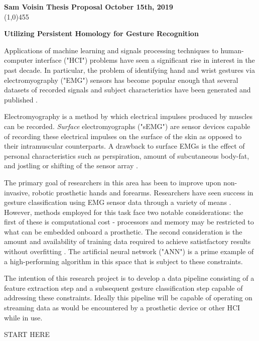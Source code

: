\documentclass[11pt]{article}
\begin{document}
\noindent \textbf{Sam Voisin \hfill  \textbf{Thesis Proposal}  \hfill  October 15th, 2019} \\
\line(1,0){455}

\begin{center}
\Large{{\bf Utilizing Persistent Homology for Gesture Recognition}}\\
\end{center}

Applications of machine learning and signals processing techniques to human-computer interface ("HCI") problems have seen a significant rise in interest in the past decade. In particular, the problem of identifying hand and wrist gestures via electromyography ("EMG") sensors has become popular enough that several datasets of recorded signals and subject characteristics have been generated and published \cite{ninapro} \cite{lobov}.

Electromyography is a method by which electrical impulses produced by muscles can be recorded. \emph{Surface} electromyographs ("sEMG") are sensor devices capable of recording these electrical impulses on the surface of the skin as opposed to their intramuscular counterparts. A drawback to surface EMGs is the effect of personal characteristics such as perspiration, amount of subcutaneous body-fat, and jostling or shifting of the sensor array \cite{lobov}.

The primary goal of researchers in this area has been to improve upon non-invasive, robotic prosthetic hands and forearms. Researchers have seen success in gesture classification using EMG sensor data through a variety of means \cite{state}. However, methods employed for this task face two notable considerations: the first of these is computational cost - processors and memory may be restricted to what can be embedded onboard a prosthetic. The second consideration is the amount and availability of training data required to achieve satistfactory results without overfitting \cite{bigdata}. The artificial neural network ("ANN") is a prime example of a high-performing algorithm in this space that is subject to these constraints.

The intention of this research project is to develop a data pipeline consisting of a feature extraction step and a subsequent gesture classification step capable of addressing these constraints. Ideally this pipeline will be capable of operating on streaming data as would be encountered by a prosthetic device or other HCI while in use.

START HERE
\end{document}
